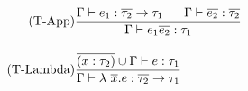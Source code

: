\begin{figure}[htb]
\begin{align*}
\tag{T-App}
&\frac
{\Gamma \vdash e_{1}:\overline{\tau_{2}} \rightarrow \tau_{1}
    \longspace
    \Gamma \vdash \overline{e_{2}}:\overline{\tau_{2}}}
{\Gamma \vdash e_{1} \overline{e_{2}}:\tau_{1}}
\\[1em]
\tag{T-Lambda}
&\frac
{\overline{(x:\tau_{2})} \cup \Gamma \vdash e : \tau_{1}}
{\Gamma \vdash \lambda\ \overline{x}.e : \overline{\tau_{2}} \rightarrow \tau_{1}}

\end{align*}
\end{figure}
